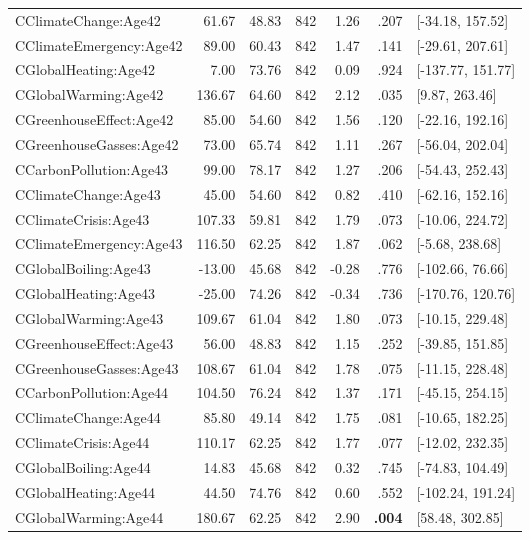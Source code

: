\begin{table}[ht]
\begin{tabular}{lrrrrrl}
  CClimateChange:Age42 & 61.67 & 48.83 & 842 & 1.26 & .207 & [-34.18, 157.52] \\ 
  CClimateEmergency:Age42 & 89.00 & 60.43 & 842 & 1.47 & .141 & [-29.61, 207.61] \\ 
  CGlobalHeating:Age42 & 7.00 & 73.76 & 842 & 0.09 & .924 & [-137.77, 151.77] \\ 
  CGlobalWarming:Age42 & 136.67 & 64.60 & 842 & 2.12 & .035 & [9.87, 263.46] \\ 
  CGreenhouseEffect:Age42 & 85.00 & 54.60 & 842 & 1.56 & .120 & [-22.16, 192.16] \\ 
  CGreenhouseGasses:Age42 & 73.00 & 65.74 & 842 & 1.11 & .267 & [-56.04, 202.04] \\ 
  CCarbonPollution:Age43 & 99.00 & 78.17 & 842 & 1.27 & .206 & [-54.43, 252.43] \\ 
  CClimateChange:Age43 & 45.00 & 54.60 & 842 & 0.82 & .410 & [-62.16, 152.16] \\ 
  CClimateCrisis:Age43 & 107.33 & 59.81 & 842 & 1.79 & .073 & [-10.06, 224.72] \\ 
  CClimateEmergency:Age43 & 116.50 & 62.25 & 842 & 1.87 & .062 & [-5.68, 238.68] \\ 
  CGlobalBoiling:Age43 & -13.00 & 45.68 & 842 & -0.28 & .776 & [-102.66, 76.66] \\ 
  CGlobalHeating:Age43 & -25.00 & 74.26 & 842 & -0.34 & .736 & [-170.76, 120.76] \\ 
  CGlobalWarming:Age43 & 109.67 & 61.04 & 842 & 1.80 & .073 & [-10.15, 229.48] \\ 
  CGreenhouseEffect:Age43 & 56.00 & 48.83 & 842 & 1.15 & .252 & [-39.85, 151.85] \\ 
  CGreenhouseGasses:Age43 & 108.67 & 61.04 & 842 & 1.78 & .075 & [-11.15, 228.48] \\ 
  CCarbonPollution:Age44 & 104.50 & 76.24 & 842 & 1.37 & .171 & [-45.15, 254.15] \\ 
  CClimateChange:Age44 & 85.80 & 49.14 & 842 & 1.75 & .081 & [-10.65, 182.25] \\ 
  CClimateCrisis:Age44 & 110.17 & 62.25 & 842 & 1.77 & .077 & [-12.02, 232.35] \\ 
  CGlobalBoiling:Age44 & 14.83 & 45.68 & 842 & 0.32 & .745 & [-74.83, 104.49] \\ 
  CGlobalHeating:Age44 & 44.50 & 74.76 & 842 & 0.60 & .552 & [-102.24, 191.24] \\ 
  CGlobalWarming:Age44 & 180.67 & 62.25 & 842 & 2.90 & \textbf{.004} & [58.48, 302.85] \\ 

\end{tabular}
\end{table}
